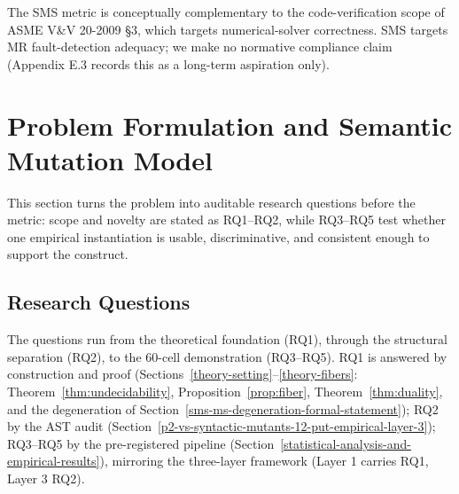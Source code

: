 \documentclass[manuscript,screen,review]{acmart}
\begin{document}
The SMS metric is conceptually complementary to the code-verification
scope of ASME V\&V 20-2009 §3, which targets numerical-solver
correctness. SMS targets MR fault-detection adequacy; we make no
normative compliance claim (Appendix E.3 records this as a long-term
aspiration only).

\section{Problem Formulation and Semantic Mutation Model}\label{research-questions-and-hypotheses}

This section turns the problem into auditable research questions before the
metric: scope and novelty are stated as RQ1--RQ2, while RQ3--RQ5 test whether one
empirical instantiation is usable, discriminative, and consistent enough to
support the construct.

\subsection{Research Questions}\label{research-questions}

The questions run from the theoretical foundation (RQ1), through the structural
separation (RQ2), to the 60-cell demonstration (RQ3--RQ5). RQ1 is answered by
construction and proof (Sections~\ref{theory-setting}--\ref{theory-fibers}:
Theorem~\ref{thm:undecidability}, Proposition~\ref{prop:fiber},
Theorem~\ref{thm:duality}, and the degeneration of
Section~\ref{sms-ms-degeneration-formal-statement}); RQ2 by the AST audit
(Section~\ref{p2-vs-syntactic-mutants-12-put-empirical-layer-3}); RQ3--RQ5 by the
pre-registered pipeline (Section~\ref{statistical-analysis-and-empirical-results}),
mirroring the three-layer framework (Layer 1 carries RQ1, Layer 3 RQ2).
\end{document}
